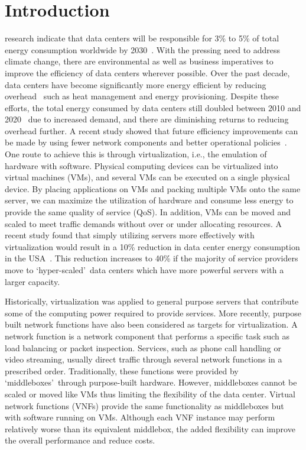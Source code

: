 \section{Introduction}
\label{sec:introduction}

 research indicate that data centers will be responsible for 3\% to 5\% of total energy consumption worldwide by 2030~\cite{AndraeE15}. With the pressing need to address climate change, there are environmental as well as business imperatives to improve the efficiency of data centers wherever possible. Over the past decade, data centers have become significantly more energy efficient by reducing overhead~\cite{AvgerinouBC17} such as heat management and energy provisioning. Despite these efforts, the total energy consumed by data centers still doubled between 2010 and 2020~\cite{DoddAGC20} due to increased demand, and there are diminishing returns to reducing overhead further. A recent study showed that future efficiency improvements can be made by using fewer network components and better operational policies~\cite{DoddAGC20}. One route to achieve this is through virtualization, i.e., the emulation of hardware with software. Physical computing devices can be virtualized into virtual machines (VMs), and several VMs can be executed on a single physical device. By placing applications on VMs and packing multiple VMs onto the same server, we can maximize the utilization of hardware and consume less energy to provide the same quality of service (QoS). In addition, VMs can be moved and scaled to meet traffic demands without over or under allocating resources. A recent study found that simply utilizing servers more effectively with virtualization would result in a 10\% reduction in data center energy consumption in the USA~\cite{ShehabiARSSD16}. This reduction increases to 40\% if the majority of service providers move to \lq hyper-scaled\rq\ data centers which have more powerful servers with a larger capacity.

Historically, virtualization was applied to general purpose servers that contribute some of the computing power required to provide services. More recently, purpose built network functions have also been considered as targets for virtualization. A network function is a network component that performs a specific task such as load balancing or packet inspection. Services, such as phone call handling or video streaming, usually direct traffic through several network functions in a prescribed order. Traditionally, these functions were provided by \lq middleboxes\rq\ through purpose-built hardware. However, middleboxes cannot be scaled or moved like VMs thus limiting the flexibility of the data center. Virtual network functions (VNFs) provide the same functionality as middleboxes but with software running on VMs. Although each VNF instance may perform relatively worse than its equivalent middlebox, the added flexibility can improve the overall performance and reduce costs.

